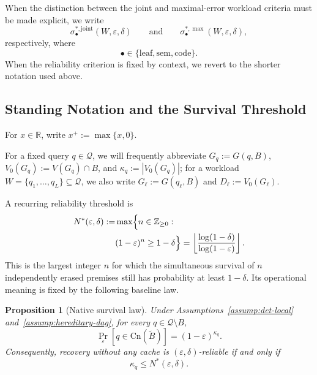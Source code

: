 \documentclass[journal]{IEEEtran}
\newcommand{\Cn}{\text{Cn}}
\newtheorem{proposition}{Proposition}[section]
\numberwithin{equation}{section}
\begin{document}
When the distinction between the joint and maximal-error workload criteria
must be made explicit, we write
\[
  \sigma_{\bullet}^{*,\mathrm{joint}}(W,\varepsilon,\delta)
  \qquad\text{and}\qquad
  \sigma_{\bullet}^{*,\max}(W,\varepsilon,\delta),
\]
respectively, where
\[
  \bullet\in\{\mathrm{leaf},\mathrm{sem},\mathrm{code}\}.
\]
When the reliability criterion is fixed by context, we revert to the shorter
notation used above.

\subsection{Standing Notation and the Survival Threshold}
\label{subsec:standing-notation}

For \(x\in\mathbb R\), write \(x^+:=\max\{x,0\}\).

For a fixed query \(q\in\mathcal Q\), we will frequently abbreviate
\(G_q:=G(q,B)\), \(V_0(G_q):=V(G_q)\cap B\), and
\(\kappa_q:=|V_0(G_q)|\); for a workload
\(W=\{q_1,\ldots,q_L\}\subseteq\mathcal Q\), we also write
\(G_\ell:=G(q_\ell,B)\) and \(D_\ell:=V_0(G_\ell)\).

A recurring reliability threshold is
\begin{equation}
  \begin{split}
    N^*(\varepsilon,\delta)
    :=& \max\Bigl\{  n\in\mathbb Z_{\ge 0}: \\
    & (1-\varepsilon)^n \ge 1-\delta \Bigr\}
    = \left\lfloor \frac{\log(1-\delta)}{\log(1-\varepsilon)} \right\rfloor.
  \end{split}
\label{eq:model-N-star}
\end{equation}
This is the largest integer \(n\) for which the simultaneous survival of
\(n\) independently erased premises still has probability at least
\(1-\delta\).  Its operational meaning is fixed by the following baseline
law.

\begin{proposition}[Native survival law]
\label{prop:native-survival}
Under Assumptions~\ref{assump:det-local} and~\ref{assump:hereditary-dag}, for
every \(q\in\mathcal Q\setminus B\),
\begin{equation}
  \Pr_{\varepsilon}\!\left[q\in\Cn(\widetilde B)\right]
  =
  (1-\varepsilon)^{\kappa_q}.
\label{eq:native-survival}
\end{equation}
Consequently, recovery without any cache is \((\varepsilon,\delta)\)-reliable
if and only if
\begin{equation}
  \kappa_q\le N^*(\varepsilon,\delta).
\label{eq:nstar-threshold}
\end{equation}
\end{proposition}
\end{document}
